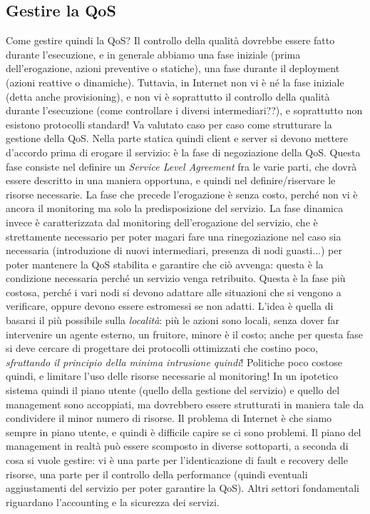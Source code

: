 \subsection{Gestire la QoS}
Come gestire quindi la QoS? Il controllo della qualità dovrebbe essere fatto durante l'esecuzione, e in generale
abbiamo una fase iniziale (prima dell'erogazione, azioni preventive o statiche), una fase durante il deployment
(azioni reattive o dinamiche). Tuttavia, in Internet non vi è né la fase iniziale (detta anche provisioning), e non
vi è soprattutto il controllo della qualità durante l'esecuzione (come controllare i diversi intermediari??), e
soprattutto non esistono protocolli standard! Va valutato caso per caso come strutturare la gestione della QoS.
Nella parte statica quindi client e server si devono mettere d'accordo prima di erogare il servizio: è la fase di
negoziazione della QoS. Questa fase consiste nel definire un \textit{Service Level Agreement} fra le varie parti,
che dovrà essere descritto in una maniera opportuna, e quindi nel definire/riservare le risorse necessarie. La fase
che precede l'erogazione è senza costo, perché non vi è ancora il monitoring ma solo la predisposizione del servizio.
La fase dinamica invece è caratterizzata dal monitoring dell'erogazione del servizio, che è strettamente necessario
per poter magari fare una rinegoziazione nel caso sia necessaria (introduzione di nuovi intermediari, presenza di
nodi guasti...) per poter mantenere la QoS stabilita e garantire che ciò avvenga: questa è la condizione necessaria
perché un servizio venga retribuito. Questa è la fase più costosa, perché i vari nodi si devono adattare alle
situazioni che si vengono a verificare, oppure devono essere estromessi se non adatti. L'idea è quella di basarsi il
più possibile sulla \textit{località}: più le azioni sono locali, senza dover far intervenire un agente esterno, un
fruitore, minore è il costo; anche per questa fase si deve cercare di progettare dei protocolli ottimizzati che
costino poco, \textit{sfruttando il principio della minima intrusione quindi}! Politiche poco costose quindi, e
limitare l'uso delle risorse necessarie al monitoring! In un ipotetico sistema quindi il piano utente (quello della
gestione del servizio) e quello del management sono accoppiati, ma dovrebbero essere strutturati in maniera tale da
condividere il minor numero di risorse. Il problema di Internet è che siamo sempre in piano utente, e quindi è
difficile capire se ci sono problemi.
Il piano del management in realtà può essere scomposto in diverse sottoparti, a seconda di cosa si vuole gestire: vi
è una parte per l'identicazione di fault e recovery delle risorse, una parte per il controllo della performance
(quindi eventuali aggiustamenti del servizio per poter garantire la QoS). Altri settori fondamentali riguardano
l'accounting e la sicurezza dei servizi.

